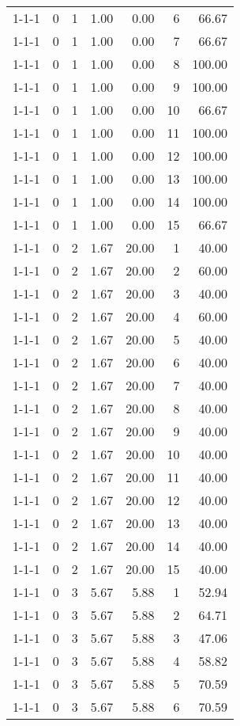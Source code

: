 \begin{tabular}{lrrrrrr}
1-1-1 & 0 & 1 & 1.00 & 0.00 & 6 & 66.67 \\
1-1-1 & 0 & 1 & 1.00 & 0.00 & 7 & 66.67 \\
1-1-1 & 0 & 1 & 1.00 & 0.00 & 8 & 100.00 \\
1-1-1 & 0 & 1 & 1.00 & 0.00 & 9 & 100.00 \\
1-1-1 & 0 & 1 & 1.00 & 0.00 & 10 & 66.67 \\
1-1-1 & 0 & 1 & 1.00 & 0.00 & 11 & 100.00 \\
1-1-1 & 0 & 1 & 1.00 & 0.00 & 12 & 100.00 \\
1-1-1 & 0 & 1 & 1.00 & 0.00 & 13 & 100.00 \\
1-1-1 & 0 & 1 & 1.00 & 0.00 & 14 & 100.00 \\
1-1-1 & 0 & 1 & 1.00 & 0.00 & 15 & 66.67 \\
1-1-1 & 0 & 2 & 1.67 & 20.00 & 1 & 40.00 \\
1-1-1 & 0 & 2 & 1.67 & 20.00 & 2 & 60.00 \\
1-1-1 & 0 & 2 & 1.67 & 20.00 & 3 & 40.00 \\
1-1-1 & 0 & 2 & 1.67 & 20.00 & 4 & 60.00 \\
1-1-1 & 0 & 2 & 1.67 & 20.00 & 5 & 40.00 \\
1-1-1 & 0 & 2 & 1.67 & 20.00 & 6 & 40.00 \\
1-1-1 & 0 & 2 & 1.67 & 20.00 & 7 & 40.00 \\
1-1-1 & 0 & 2 & 1.67 & 20.00 & 8 & 40.00 \\
1-1-1 & 0 & 2 & 1.67 & 20.00 & 9 & 40.00 \\
1-1-1 & 0 & 2 & 1.67 & 20.00 & 10 & 40.00 \\
1-1-1 & 0 & 2 & 1.67 & 20.00 & 11 & 40.00 \\
1-1-1 & 0 & 2 & 1.67 & 20.00 & 12 & 40.00 \\
1-1-1 & 0 & 2 & 1.67 & 20.00 & 13 & 40.00 \\
1-1-1 & 0 & 2 & 1.67 & 20.00 & 14 & 40.00 \\
1-1-1 & 0 & 2 & 1.67 & 20.00 & 15 & 40.00 \\
1-1-1 & 0 & 3 & 5.67 & 5.88 & 1 & 52.94 \\
1-1-1 & 0 & 3 & 5.67 & 5.88 & 2 & 64.71 \\
1-1-1 & 0 & 3 & 5.67 & 5.88 & 3 & 47.06 \\
1-1-1 & 0 & 3 & 5.67 & 5.88 & 4 & 58.82 \\
1-1-1 & 0 & 3 & 5.67 & 5.88 & 5 & 70.59 \\
1-1-1 & 0 & 3 & 5.67 & 5.88 & 6 & 70.59 \\

\end{tabular}
